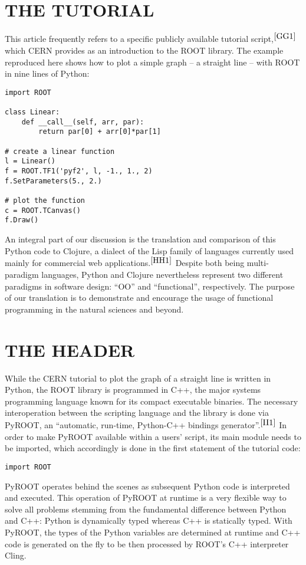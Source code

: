 \documentclass[twocolumn]{article}
\begin{document}
\section{THE TUTORIAL}
This article frequently refers to a specific publicly available tutorial script,$^{\cite{GG1}}$ which CERN provides as an introduction to the ROOT library. The example reproduced here shows how to plot a simple graph – a straight line – with ROOT in nine lines of Python:
{\color{magenta}\begin{verbatim}
import ROOT

class Linear:
    def __call__(self, arr, par):
        return par[0] + arr[0]*par[1]

# create a linear function
l = Linear()
f = ROOT.TF1('pyf2', l, -1., 1., 2)
f.SetParameters(5., 2.)

# plot the function
c = ROOT.TCanvas()
f.Draw()
\end{verbatim}}
An integral part of our discussion is the translation and comparison of this Python code to Clojure, a dialect of the Lisp family of languages currently used mainly for commercial web applications.$^{\cite{HH1}}$ Despite both being multi-paradigm languages, Python and Clojure nevertheless represent two different paradigms in software design: “OO” and “functional”, respectively. The purpose of our translation is to demonstrate and encourage the usage of functional programming in the natural sciences and beyond.

\section{THE HEADER}
While the CERN tutorial to plot the graph of a straight line is written in Python, the ROOT library is programmed in C++, the major systems programming language known for its compact executable binaries. The necessary interoperation between the scripting language and the library is done via PyROOT, an “automatic, run-time, Python-C++ bindings generator”.$^{\cite{II1}}$ In order to make PyROOT available within a users’ script, its main module needs to be imported, which accordingly is done in the first statement of the tutorial code:
{\color{magenta}\begin{verbatim}
import ROOT
\end{verbatim}}
PyROOT operates behind the scenes as subsequent Python code is interpreted and executed. This operation of PyROOT at runtime is a very flexible way to solve all problems stemming from the fundamental difference between Python and C++: Python is dynamically typed whereas C++ is statically typed. With PyROOT, the types of the Python variables are determined at runtime and C++ code is generated on the fly to be then processed by ROOT’s C++ interpreter Cling.
\end{document}
